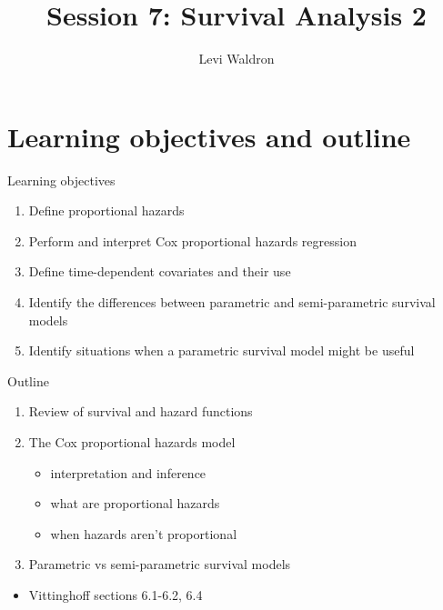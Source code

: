 \documentclass[
  ignorenonframetext,
]{beamer}
\title{Session 7: Survival Analysis 2}
\author{Levi Waldron}
\date{}
\institute{CUNY SPH Biostatistics 2}
\providecommand{\tightlist}{%
  \setlength{\itemsep}{0pt}\setlength{\parskip}{0pt}}
\begin{document}
\frame{\titlepage}

\hypertarget{learning-objectives-and-outline}{%
\section{Learning objectives and
outline}\label{learning-objectives-and-outline}}

\begin{frame}{Learning objectives}
\protect\hypertarget{learning-objectives}{}

\begin{enumerate}
\tightlist
\item
  Define proportional hazards
\item
  Perform and interpret Cox proportional hazards regression
\item
  Define time-dependent covariates and their use
\item
  Identify the differences between parametric and semi-parametric
  survival models
\item
  Identify situations when a parametric survival model might be useful
\end{enumerate}

\end{frame}

\begin{frame}{Outline}
\protect\hypertarget{outline}{}

\begin{enumerate}
\tightlist
\item
  Review of survival and hazard functions
\item
  The Cox proportional hazards model

  \begin{itemize}
  \tightlist
  \item
    interpretation and inference
  \item
    what are proportional hazards
  \item
    when hazards aren't proportional
  \end{itemize}
\item
  Parametric vs semi-parametric survival models
\end{enumerate}

\begin{itemize}
\tightlist
\item
  Vittinghoff sections 6.1-6.2, 6.4
\end{itemize}

\end{frame}
\end{document}
